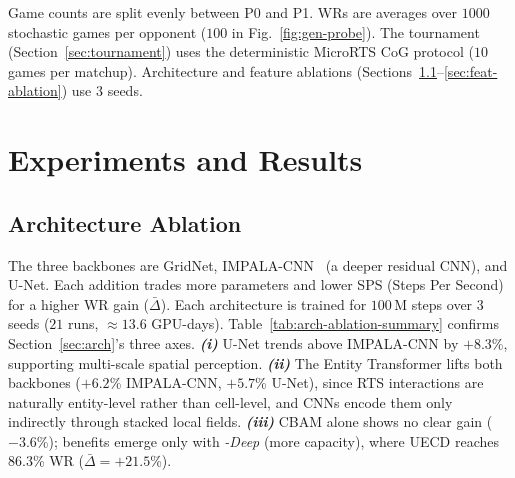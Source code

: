 \documentclass[conference]{IEEEtran}
\newcommand{\code}[1]{{\ttfamily\hyphenchar\font=45\relax #1}}
\begin{document}
Game counts are split evenly between P0 and P1. WRs are averages over $1000$ stochastic games per opponent ($100$ in Fig.~\ref{fig:gen-probe}). The tournament (Section~\ref{sec:tournament}) uses the deterministic MicroRTS CoG protocol ($10$ games per matchup). Architecture and feature ablations (Sections~\ref{sec:arch-ablation}--\ref{sec:feat-ablation}) use $3$ seeds.

\section{Experiments and Results}
\label{sec:experiments}

\subsection{Architecture Ablation}
\label{sec:arch-ablation}

The three backbones are GridNet, IMPALA-CNN~\cite{espeholtIMPALAScalableDistributed2018} (a deeper residual CNN), and U-Net. Each addition trades more parameters and lower SPS (Steps Per Second) for a higher WR gain ($\bar{\Delta}$). Each architecture is trained for $100$\,M steps over $3$ seeds ($21$ runs, $\approx\!13.6$ GPU-days). Table~\ref{tab:arch-ablation-summary} confirms Section~\ref{sec:arch}'s three axes. \textbf{\emph{(i)}} U-Net trends above IMPALA-CNN by $+8.3$\%, supporting multi-scale spatial perception. \textbf{\emph{(ii)}} The Entity Transformer lifts both backbones ($+6.2$\% IMPALA-CNN, $+5.7$\% U-Net), since RTS interactions are naturally entity-level rather than cell-level, and CNNs encode them only indirectly through stacked local fields. \textbf{\emph{(iii)}} CBAM alone shows no clear gain ($-3.6$\%); benefits emerge only with \emph{-Deep} (more capacity), where \code{UECD} reaches $86.3$\% WR ($\bar{\Delta}=+21.5$\%).
\end{document}

